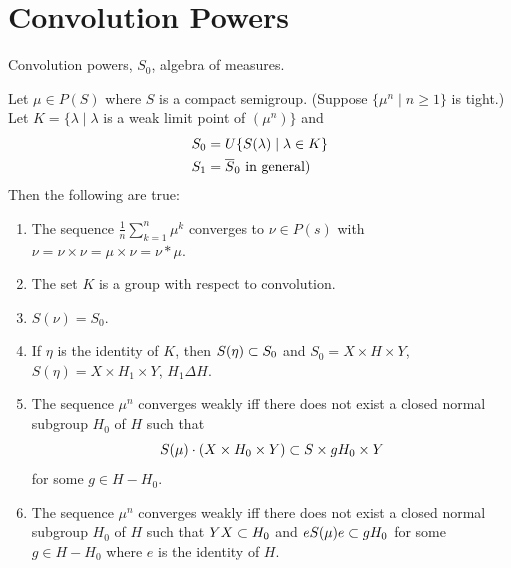 
\section{Convolution Powers}
\label{sec:3.5}

  Convolution powers, $S_0$, algebra of measures.

\begin{theorem}		\label{thm:3.10} 
Let $\mu \in P(S)$ where $S$ is a compact semigroup.  
(Suppose $\{ \mu^n \mid n \ge 1 \}$ is tight.)  
Let $K = \{ \lambda \mid \lambda$ is a weak limit point of $(\mu^n) \}$ and
\[
\begin{aligned}
       S_0 &= U\{ S(\lambda) \mid \lambda \in K \}         \\
       S_1 &= \overline S_0 \hbox{ in general})
\end{aligned}
\]
Then the following are true:
%
\begin{enumerate}
\item[{\normalfont(a)}] The sequence $\frac{1}{n} \sum\limits^n_{k=1} \mu^k$ converges to $\nu \in P(s)$ with $\nu = \nu \times \nu = \mu \times \nu
 = \nu * \mu$.

\item[{\normalfont(b)}] The set $K$ is a group with respect to convolution.

\item[{\normalfont(c)}] $S(\nu) = S_0$.

\item[{\normalfont(d)}] If $\eta$ is the identity of $K$, then $S(\eta) \subset S_0$ and $S_0 = X \times H \times Y$, $S(\eta) = X \times H_1 \times Y$, $H_1 \Delta H$.

\item[{\normalfont(e)}] The sequence $\mu^n$ converges weakly if{f} there does not exist a closed normal subgroup $H_0$ of $H$ such that
\[
     S(\mu) \cdot (X \times H_0 \times Y) \subset S \times gH_0 \times Y
\]
for some $g \in H - H_0$.

\item[{\normalfont(f)}] The sequence $\mu^n$ converges weakly if{f} there does not exist a closed normal subgroup $H_0$ of $H$ such that $YX \subset H_0$ and $eS(\mu)e \subset gH_0$ for some $g \in H-H_0$ where $e$ is the identity of $H$.
\end{enumerate}
%
\end{theorem}

